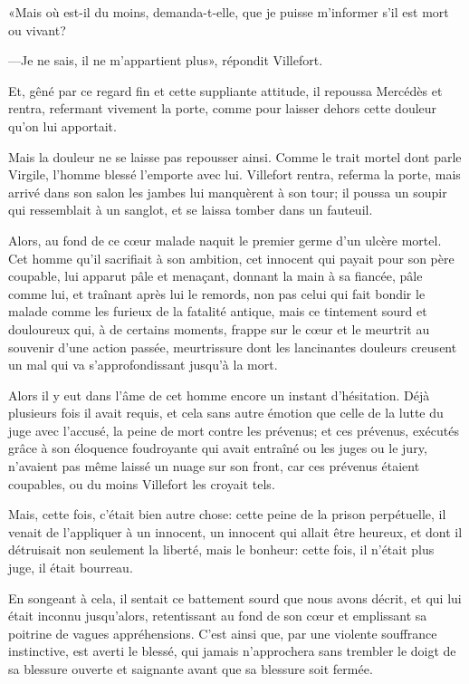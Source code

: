 «Mais où est-il du moins, demanda-t-elle, que je puisse m'informer s'il est mort ou vivant?

—Je ne sais, il ne m'appartient plus», répondit Villefort.

Et, gêné par ce regard fin et cette suppliante attitude, il repoussa Mercédès et rentra, refermant vivement la porte, comme pour laisser dehors cette douleur qu'on lui apportait.

Mais la douleur ne se laisse pas repousser ainsi. Comme le trait mortel dont parle Virgile, l'homme blessé l'emporte avec lui. Villefort rentra, referma la porte, mais arrivé dans son salon les jambes lui manquèrent à son tour; il poussa un soupir qui ressemblait à un sanglot, et se laissa tomber dans un fauteuil.

Alors, au fond de ce cœur malade naquit le premier germe d'un ulcère mortel. Cet homme qu'il sacrifiait à son ambition, cet innocent qui payait pour son père coupable, lui apparut pâle et menaçant, donnant la main à sa fiancée, pâle comme lui, et traînant après lui le remords, non pas celui qui fait bondir le malade comme les furieux de la fatalité antique, mais ce tintement sourd et douloureux qui, à de certains moments, frappe sur le cœur et le meurtrit au souvenir d'une action passée, meurtrissure dont les lancinantes douleurs creusent un mal qui va s'approfondissant jusqu'à la mort.

Alors il y eut dans l'âme de cet homme encore un instant d'hésitation. Déjà plusieurs fois il avait requis, et cela sans autre émotion que celle de la lutte du juge avec l'accusé, la peine de mort contre les prévenus; et ces prévenus, exécutés grâce à son éloquence foudroyante qui avait entraîné ou les juges ou le jury, n'avaient pas même laissé un nuage sur son front, car ces prévenus étaient coupables, ou du moins Villefort les croyait tels.

Mais, cette fois, c'était bien autre chose: cette peine de la prison perpétuelle, il venait de l'appliquer à un innocent, un innocent qui allait être heureux, et dont il détruisait non seulement la liberté, mais le bonheur: cette fois, il n'était plus juge, il était bourreau.

En songeant à cela, il sentait ce battement sourd que nous avons décrit, et qui lui était inconnu jusqu'alors, retentissant au fond de son cœur et emplissant sa poitrine de vagues appréhensions. C'est ainsi que, par une violente souffrance instinctive, est averti le blessé, qui jamais n'approchera sans trembler le doigt de sa blessure ouverte et saignante avant que sa blessure soit fermée.

